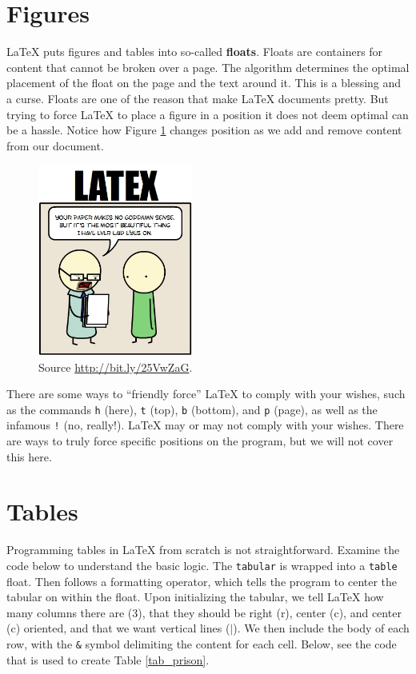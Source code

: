 \documentclass[11pt,letterpaper,oneside]{article} %
\begin{document}
\section{Figures}
{\LaTeX} puts figures and tables into so-called \textbf{floats}. Floats are containers for content that cannot be broken over a page. The algorithm determines the optimal placement of the float on the page and the text around it. This is a blessing and a curse. Floats are one of the reason that make {\LaTeX} documents pretty. But trying to force {\LaTeX} to place a figure in a position it does not deem optimal can be a hassle. Notice how Figure \ref{graph1} changes position as we add and remove content from our document.

\begin{figure}[!h] 
\begin{center}
\includegraphics[width = 2in]{latex_comic.jpg}
\caption{Source \url{http://bit.ly/25VwZaG}.}
\label{graph1}
\end{center}
\end{figure}


There are some ways to ``friendly force'' %
{\LaTeX} to comply with your wishes, such as the commands \texttt{h} (here),  \texttt{t} (top),  \texttt{b} (bottom), and  \texttt{p} (page), as well as the infamous  \texttt{!} (no, really!). {\LaTeX} may or may not comply with your wishes. There are ways to truly force specific positions on the program, but we will not cover this here. 


\section{Tables}
Programming tables in {\LaTeX} from scratch is not straightforward. Examine the code below to understand the basic logic. The \texttt{tabular} is wrapped into a \texttt{table} float. Then follows a formatting operator, which tells the program to center the tabular on within the float. Upon initializing the tabular, we tell {\LaTeX} how many columns there are (3), that they should be right (r), center (c), and center (c) oriented, and that we want vertical lines ($|$). We then include the body of each row, with the \texttt{\&} symbol delimiting the content for each cell. Below, see the code that is used to create Table \ref{tab_prison}.
\end{document}
